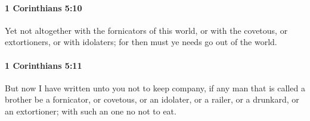 		\paragraph{1 Corinthians 5:10} %
			\label{1CORINTHIANS-5-10}

			Yet not altogether with the fornicators of this world, or with the covetous, or extortioners, or with idolaters; for then must ye needs go out of the world.

			\begin{framed}
			\scriptsize
				\begin{compactdesc}
					\item[SBLG] 
				\end{compactdesc}
			\end{framed}

		\paragraph{1 Corinthians 5:11} %
			\label{1CORINTHIANS-5-11}

			But now I have written unto you not to keep company, if any man that is called a brother be a fornicator, or covetous, or an idolater, or a railer, or a drunkard, or an extortioner; with such an one no not to eat.

